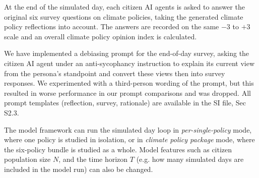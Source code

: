 \documentclass[pdflatex,sn-mathphys-num]{sn-jnl}%
\theoremstyle{thmstyleone}%
\theoremstyle{thmstyletwo}%
\theoremstyle{thmstylethree}%
\begin{document}
At the end of the simulated day, each citizen AI agents is asked to answer the original
six survey
questions on climate policies, taking the generated climate policy reflections into
account. The answers are recorded on the same $-3$ to $+3$ scale and an overall climate
policy opinion index is calculated.

We have implemented a debiasing prompt for the end-of-day survey, asking the citizen AI
agent under an anti-sycophancy instruction to explain its current view from the
persona's standpoint and convert these views then into survey responses. We experimented
with a third-person wording of the prompt, but this resulted in worse performance in our
prompt comparisons and was dropped. All prompt templates (reflection, survey, rationale)
are available in the SI file, Sec S2.3.

The model framework can run the simulated day loop in \emph{per-single-policy} mode,
where
one policy is studied in isolation, or in \emph{climate policy package} mode, where
the six-policy bundle is studied as a whole. Model features such as citizen population
size $N$, and the time horizon $T$ (e.g. how many simulated days are included in the
model run) can also be changed.



\end{document}

